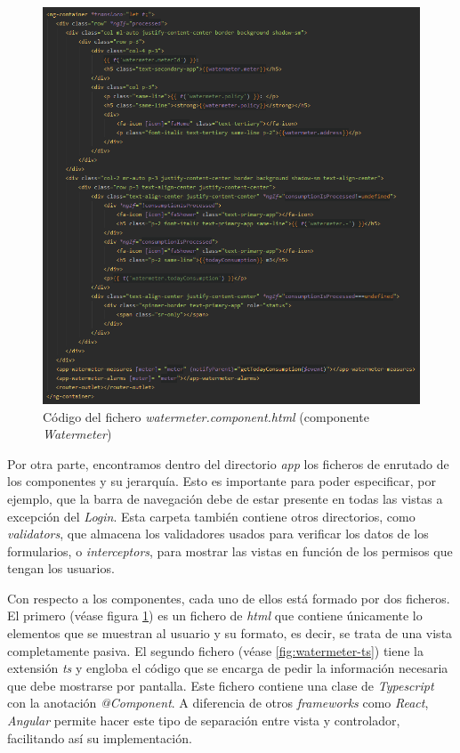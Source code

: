 \documentclass[pdftex,11pt,a4paper]{book}
\begin{document}
 \begin{figure}[h]
 \centering
 \includegraphics [scale=0.72] {images/implementacion/componente-watermeter-html.png}
 \caption{Código del fichero \textit{watermeter.component.html} (componente \textit{Watermeter})} \label{fig:watermeter-html}
 \end{figure}

Por otra parte, encontramos dentro del directorio \textit{app} los ficheros de enrutado de los componentes y su jerarquía. Esto es importante para poder especificar, por ejemplo, que la barra de navegación debe de estar presente en todas las vistas a excepción del \textit{Login}. Esta carpeta también contiene otros directorios, como \textit{validators}, que almacena los validadores usados para verificar los datos de los formularios, o \textit{interceptors}, para mostrar las vistas en función de los permisos que tengan los usuarios.

Con respecto a los componentes, cada uno de ellos está formado por dos ficheros. El primero (véase figura \ref{fig:watermeter-html}) es un fichero de \textit{html} que contiene únicamente lo elementos que se muestran al usuario y su formato, es decir, se trata de una vista completamente pasiva. El segundo fichero (véase \ref{fig:watermeter-ts}) tiene la extensión \textit{ts} y engloba el código que se encarga de pedir la información necesaria que debe mostrarse por pantalla. Este fichero contiene una clase de \textit{Typescript} con la anotación \textit{@Component}. A diferencia de otros \textit{frameworks} como \textit{React}, \textit{Angular} permite hacer este tipo de separación entre vista y controlador, facilitando así su implementación.
\end{document}
